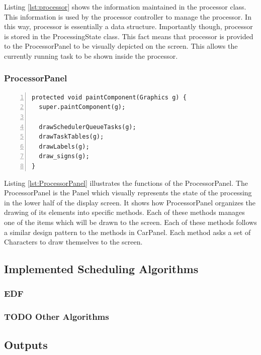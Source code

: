 \documentclass{article} %
\begin{document}
Listing \ref{lst:processor} shows the information maintained in the processor class.
This information is used by the processor controller to manage the processor.
In this way, processor is essentially a data structure.
Importantly though, processor is stored in the ProcessingState class.
This fact means that processor is provided to the ProcessorPanel to be visually depicted on the screen.
This allows the currently running task to be shown inside the processor.

\subsubsection{ProcessorPanel}
\begin{lstlisting}[caption={},label={lst:ProcessorPanel},numbers=left]
protected void paintComponent(Graphics g) {
  super.paintComponent(g);

  drawSchedulerQueueTasks(g);
  drawTaskTables(g);
  drawLabels(g);
  draw_signs(g);
}
\end{lstlisting}

Listing \ref{lst:ProcessorPanel} illustrates the functions of the ProcessorPanel.
The ProcessorPanel is the Panel which visually represents the state of the processing in the lower half of the display screen.
It shows how ProcessorPanel organizes the drawing of its elements into specific methods.
Each of these methods manages one of the items which will be drawn to the screen.
Each of these methods follows a similar design pattern to the methods in CarPanel.
Each method asks a set of Characters to draw themselves to the screen.

\subsection{Implemented Scheduling Algorithms}
\subsubsection{EDF}

\subsubsection{TODO Other Algorithms}

\subsection{Outputs}
\end{document}
